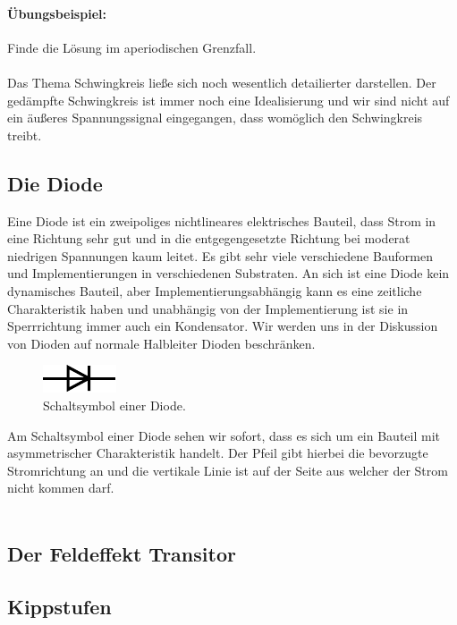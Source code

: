 \documentclass[11pt,a4paper,leqno]{report}
\numberwithin{equation}{chapter}
\begin{document}
\paragraph{\"Ubungsbeispiel:} Finde die L\"osung im aperiodischen Grenzfall.\\
\\
Das Thema Schwingkreis lie\ss{}e sich noch wesentlich detailierter darstellen. Der ged\"ampfte Schwingkreis ist immer noch eine Idealisierung und wir sind nicht auf ein \"au\ss{}eres Spannungssignal eingegangen, dass wom\"oglich den Schwingkreis treibt. 
\subsection{Die Diode}
Eine Diode ist ein zweipoliges nichtlineares elektrisches Bauteil, dass Strom in eine Richtung sehr gut und in die entgegengesetzte Richtung bei moderat niedrigen Spannungen kaum leitet. Es gibt sehr viele verschiedene Bauformen und Implementierungen in verschiedenen Substraten. An sich ist eine Diode kein dynamisches Bauteil, aber Implementierungsabh\"angig kann es eine zeitliche Charakteristik haben und unabh\"angig von der Implementierung ist sie in Sperrrichtung immer auch ein Kondensator. Wir werden uns in der Diskussion von Dioden auf normale Halbleiter Dioden beschr\"anken.
\begin{figure}[H]
	\begin{center}
		\includegraphics[scale=1.5]{diode.pdf}
		\caption{Schaltsymbol einer Diode.}
	\end{center}
\end{figure}
\noindent
Am Schaltsymbol einer Diode sehen wir sofort, dass es sich um ein Bauteil mit asymmetrischer Charakteristik handelt. Der Pfeil gibt hierbei die bevorzugte Stromrichtung an und die vertikale Linie ist auf der Seite aus welcher der Strom nicht kommen darf.\\
\\

\subsection{Der Feldeffekt Transitor}

\subsection{Kippstufen}
\end{document}
